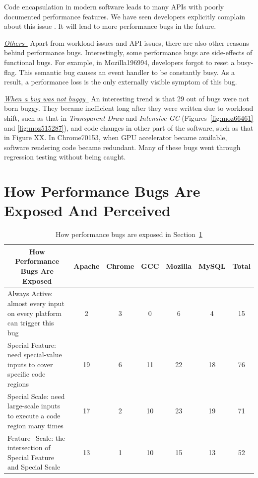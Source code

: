 Code encapsulation in modern software leads to many APIs with poorly 
documented performance features. 
We have seen developers explicitly complain about this issue 
\citep{apache45396}. It will lead to more performance bugs in the future.

\underline{\it Others\ }
Apart from workload issues and API issues, there are also other reasons behind
performance bugs. Interestingly,
some performance bugs are side-effects of functional bugs. For example, 
in Mozilla196994,
developers forgot to reset a busy-flag. This semantic bug causes an event 
handler to be constantly busy. As a result, a performance loss is the only 
externally visible 
symptom of this bug.

\underline{\it When a bug was not buggy\ }
An interesting trend is that 29 out of \allbugs bugs were not born buggy.
They became inefficient long after they were written due to workload shift,
such as that in {\it Transparent Draw} and {\it Intensive GC}
(Figures~\ref{fig:moz66461} and \ref{fig:moz515287}), 
and code changes in other part of the software, such as
that in Figure XX.
In Chrome70153, when GPU accelerator became available, software
rendering code became redundant.
Many of these bugs went through regression testing without being caught.



\section{How Performance Bugs Are Exposed And Perceived}
\label{sec:char_exp}


\begin{table}[tb!]
\begin{adjustwidth}{-.5in}{-.5in}
\scriptsize
\centering
{
\begin{tabular}{lcccccc}
\toprule
\multicolumn{1}{c}{\bf How Performance Bugs Are Exposed} &Apache&Chrome&GCC&Mozilla&MySQL&Total\\
\midrule
\multicolumn{1}{l}{Always Active: almost every input on every platform can trigger this bug}
&2&3&0&6&4&15\\
\midrule
\multicolumn{1}{l}{Special Feature: need special-value inputs to cover specific code regions}
&19&6&11&22&18&76\\
\midrule
\multicolumn{1}{l}{Special Scale: need large-scale inputs to execute a code region many times}
&17&2&10&23&19&71\\
\midrule
\multicolumn{1}{l}{Feature+Scale: the intersection of Special Feature and Special Scale}
&13&1&10&15&13&52\\
\bottomrule
\end{tabular}
}
\end{adjustwidth}
\caption{How performance bugs are exposed in Section~\ref{sec:char_exp}}
\label{tab:exp}
\end{table}

